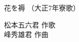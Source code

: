 \documentclass[10pt,b5j]{tarticle} %
\begin{document}
\begin{minipage}[c]{0.7\hsize} %
    \begin{center}
        {\LARGE
            花を褥 %
        }
        {\small 
            （大正7年寮歌） %
        }
    \end{center}
\end{minipage}
\begin{minipage}[c]{0.3\hsize} %
    \begin{flushright} %
        松本五六君 作歌\\峰秀雄君 作曲 %
    \end{flushright}
\end{minipage}
\end{document}
